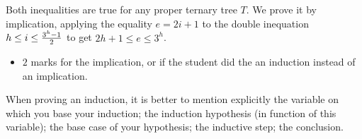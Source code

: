 \begin{enumerate}
\begin{solution}
Both inequalities are true for any proper ternary tree $T$.
%
We prove it by implication, applying the equality $e=2i+1$ to the
double inequation $h\leq i \leq {3^h-1\over 2}$ to get
$2h+1\leq e \leq 3^h$.

\begin{markingScheme}
\begin{itemize}
\item $2$ marks for the implication, or if the student did the
an induction instead of an implication.
\end{itemize}
\end{markingScheme}

\end{solution}






\end{enumerate}


\begin{hint}
When proving an induction, it is better to mention explicitly
the variable on which you base your induction;
the induction hypothesis (in function of this variable);
the base case of your hypothesis;
the inductive step;
the conclusion.
\end{hint}
